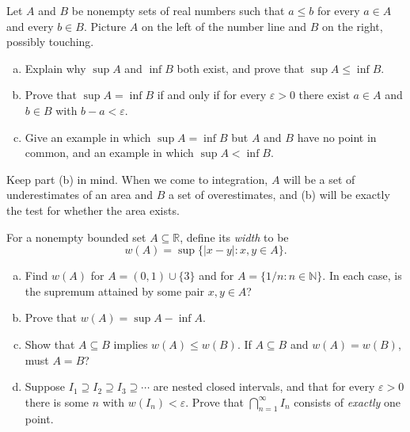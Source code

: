 \begin{problem}
Let $A$ and $B$ be nonempty sets of real numbers such that $a \leq b$ for every $a \in A$ and every $b \in B$.  Picture $A$ on the left of the number line and $B$ on the right, possibly touching.
\begin{enumerate}[(a)]
	\item Explain why $\sup A$ and $\inf B$ both exist, and prove that $\sup A \leq \inf B$.
	\item Prove that $\sup A = \inf B$ if and only if for every $\varepsilon > 0$ there exist $a \in A$ and $b \in B$ with $b - a < \varepsilon$.
	\item Give an example in which $\sup A = \inf B$ but $A$ and $B$ have no point in common, and an example in which $\sup A < \inf B$.
\end{enumerate}
Keep part (b) in mind.  When we come to integration, $A$ will be a set of underestimates of an area and $B$ a set of overestimates, and (b) will be exactly the test for whether the area exists.
\end{problem}

\begin{problem}
For a nonempty bounded set $A \subseteq \mathbb{R}$, define its \emph{width} to be
\[ w(A) = \sup \{ |x - y| : x, y \in A \}. \]
\begin{enumerate}[(a)]
	\item Find $w(A)$ for $A = (0,1) \cup \{3\}$ and for $A = \{1/n : n \in \mathbb{N}\}$.  In each case, is the supremum attained by some pair $x, y \in A$?
	\item Prove that $w(A) = \sup A - \inf A$.
	\item Show that $A \subseteq B$ implies $w(A) \leq w(B)$.  If $A \subseteq B$ and $w(A) = w(B)$, must $A = B$?
	\item Suppose $I_1 \supseteq I_2 \supseteq I_3 \supseteq \cdots$ are nested closed intervals, and that for every $\varepsilon > 0$ there is some $n$ with $w(I_n) < \varepsilon$.  Prove that $\bigcap_{n=1}^{\infty} I_n$ consists of \emph{exactly} one point.
\end{enumerate}
\end{problem}

